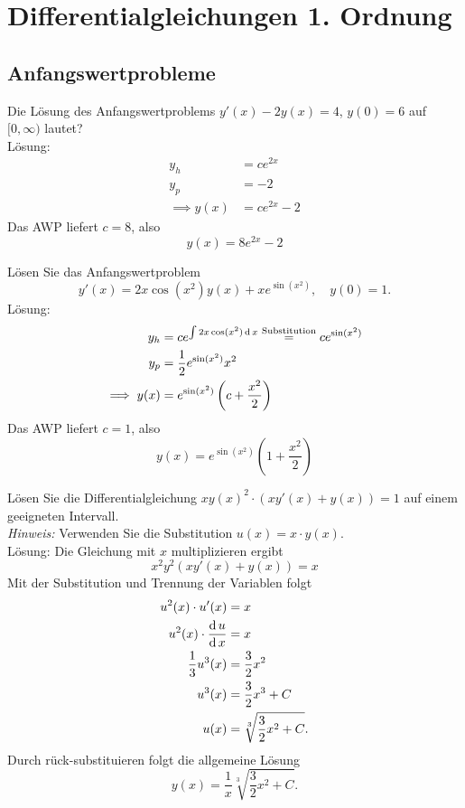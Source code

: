 \section{Differentialgleichungen 1. Ordnung}
\subsection{Anfangswertprobleme}
Die Lösung des Anfangswertproblems $y'(x) - 2y(x) = 4$, $y(0) = 6$ auf $[0,\infty)$ lautet?\\
Lösung:
\begin{align*}
  y_h &= c e^{2x}\\
  y_p &= -2\\
  \implies y(x) &= ce^{2x} - 2
\end{align*}
Das AWP liefert $c = 8$, also
\begin{displaymath}
  y(x) = 8e^{2x} - 2
\end{displaymath}

Lösen Sie das Anfangswertproblem 
\begin{displaymath}
  y'(x) = 2x \cos(x^2)y(x) + xe^{\sin(x^2)}, \quad y(0) = 1.
\end{displaymath}
Lösung:
\begin{align*}
  y_h &= ce^{\int 2x\cos(x^2) \operatorname{\mathop{}\!\mathrm{d}} x} \overset{\text{Substitution}}{=} ce^{\sin(x^2)}\\
  y_p &= \frac{1}{2} e^{\sin(x^2)} x^2\\
  \implies y(x) &= e^{\sin(x^2)} \left(c + \frac{x^2}{2}\right)
\end{align*}
Das AWP liefert $c = 1$, also
\begin{displaymath}
  y(x) = e^{\sin(x^2)} \left(1 + \frac{x^2}{2}\right)
\end{displaymath}

Lösen Sie die Differentialgleichung $xy(x)^2 \cdot (xy'(x) + y(x)) = 1$ auf einem geeigneten Intervall.\\
\textit{Hinweis:}
Verwenden Sie die Substitution $u(x) = x \cdot y(x)$.\\
Lösung:
Die Gleichung mit $x$ multiplizieren ergibt
\begin{displaymath}
  x^2 y^2 (xy'(x) + y(x)) = x
\end{displaymath}
Mit der Substitution und Trennung der Variablen folgt
\begin{align*}
  u^2(x) \cdot u'(x) &= x\\
  u^2(x) \cdot \frac{\operatorname{\mathop{}\!\mathrm{d}} u}{\operatorname{\mathop{}\!\mathrm{d}} x} &= x\\
  \frac{1}{3} u^3(x)& = \frac{3}{2} x^2\\
  u^3(x) &= \frac{3}{2}x^3 + C\\
  u(x) &= \sqrt[3]{\frac{3}{2} x^2 + C}.
\end{align*}
Durch rück-substituieren folgt die allgemeine Lösung
\begin{displaymath}
  y(x) = \frac{1}{x} \sqrt[3]{\frac{3}{2} x^2 + C}.
\end{displaymath}


